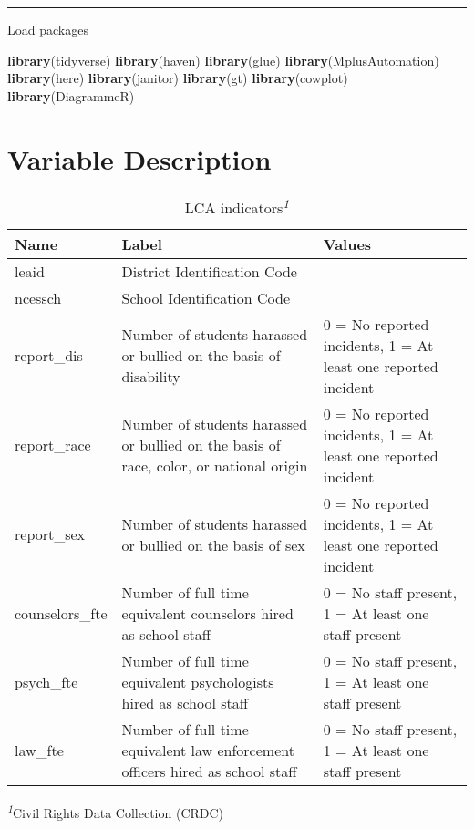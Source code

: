 \documentclass[
]{book}
\newenvironment{Shaded}{\begin{snugshade}}{\end{snugshade}}
\newcommand{\FunctionTok}[1]{\textcolor[rgb]{0.13,0.29,0.53}{\textbf{#1}}}
\newcommand{\NormalTok}[1]{#1}
\begin{document}
\begin{center}\rule{0.5\linewidth}{0.5pt}\end{center}

Load packages

\begin{Shaded}
\begin{Highlighting}[]
\FunctionTok{library}\NormalTok{(tidyverse)}
\FunctionTok{library}\NormalTok{(haven)}
\FunctionTok{library}\NormalTok{(glue)}
\FunctionTok{library}\NormalTok{(MplusAutomation)}
\FunctionTok{library}\NormalTok{(here)}
\FunctionTok{library}\NormalTok{(janitor)}
\FunctionTok{library}\NormalTok{(gt)}
\FunctionTok{library}\NormalTok{(cowplot)}
\FunctionTok{library}\NormalTok{(DiagrammeR) }
\end{Highlighting}
\end{Shaded}

\section{Variable Description}\label{variable-description}

\begin{table}[!t]
\caption*{
{\large LCA indicators\textsuperscript{\textit{1}}}
} 
\fontsize{12.0pt}{14.4pt}\selectfont
\begin{tabular*}{0.75\linewidth}{@{\extracolsep{\fill}}lll}
\toprule
Name & Label & Values \\ 
\midrule\addlinespace[2.5pt]
leaid & District Identification Code &  \\ 
ncessch & School Identification Code &  \\ 
report\_dis & Number of students harassed or bullied on the basis of disability & 0 = No reported incidents, 1 = At least one reported incident \\ 
report\_race & Number of students harassed or bullied on the basis of race, color, or national origin & 0 = No reported incidents, 1 = At least one reported incident \\ 
report\_sex & Number of students harassed or bullied on the basis of sex & 0 = No reported incidents, 1 = At least one reported incident \\ 
counselors\_fte & Number of full time equivalent counselors hired as school staff & 0 = No staff present, 1 = At least one staff present \\ 
psych\_fte & Number of full time equivalent psychologists hired as school staff & 0 = No staff present, 1 = At least one staff present \\ 
law\_fte & Number of full time equivalent law enforcement officers hired as school staff & 0 = No staff present, 1 = At least one staff present \\ 
\bottomrule
\end{tabular*}
\begin{minipage}{\linewidth}
\textsuperscript{\textit{1}}Civil Rights Data Collection (CRDC)\\
\end{minipage}
\end{table}
\end{document}
